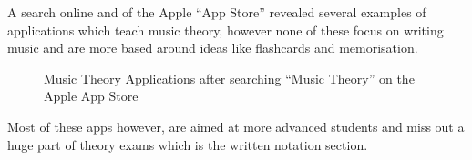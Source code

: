 A search online and of the Apple ``App Store'' revealed several examples of applications which teach music theory, however none of these focus on writing music and are more based around ideas like flashcards and memorisation.

\begin{figure}[h!]
  \centering
  \caption{Music Theory Applications after searching ``Music Theory'' on the Apple App Store}
\end{figure}

Most of these apps however, are aimed at more advanced students and miss out a huge part of theory exams which is the written notation section.
